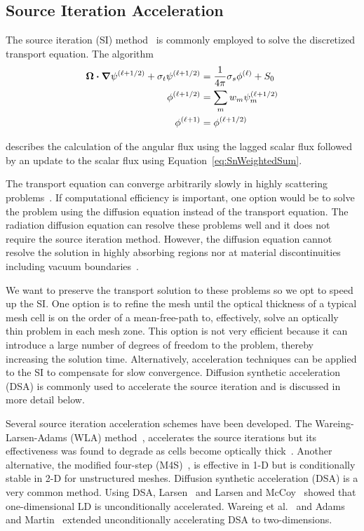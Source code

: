\documentclass{article}
\begin{document}
\subsection{Source Iteration Acceleration}
The source iteration (SI) method~\cite{Lewis_Comp_Methods_Neu_Trans} is commonly employed to solve the discretized transport equation. The algorithm
\begin{subequations}
\begin{flalign}
\bm{\Omega} \bm{\cdot} \bm{\nabla} \psi^{(\ell+1/2)} + \sigma_t \psi^{(\ell+1/2)} & = \frac{1}{4 \pi} \sigma_s \phi^{(\ell)} + S_0 \\
\phi^{(\ell+1/2)} & = \sum_m w_m \psi^{(\ell+1/2)}_m \\
\phi^{(\ell+1)} & = \phi^{(\ell+1/2)}
\end{flalign}
\label{eqs:SourceIteration}
\end{subequations}

\noindent describes the calculation of the angular flux using the lagged scalar flux followed by an update to the scalar flux using Equation~\ref{eq:SnWeightedSum}.

The transport equation can converge arbitrarily slowly in highly scattering problems~\cite{LarsenStableDSATheory}. If computational efficiency is important, one option would be to solve the problem using the diffusion equation instead of the transport equation. The radiation diffusion equation can resolve these problems well and it does not require the source iteration method. However, the diffusion equation cannot resolve the solution in highly absorbing regions nor at material discontinuities including vacuum boundaries~\cite{D&H}.

We want to preserve the transport solution to these problems so we opt to speed up the SI. One option is to refine the mesh until the optical thickness of a typical mesh cell is on the order of a mean-free-path to, effectively, solve an optically thin problem in each mesh zone. This option is not very efficient because it can introduce a large number of degrees of freedom to the problem, thereby increasing the solution time. Alternatively, acceleration techniques can be applied to the SI to compensate for slow convergence. Diffusion synthetic acceleration (DSA) is commonly used to accelerate the source iteration and is discussed in more detail below.

Several source iteration acceleration schemes have been developed. The Wareing-Larsen-Adams (WLA) method~\cite{WareingDSADFEM}, accelerates the source iterations but its effectiveness was found to degrade as cells become optically thick~\cite{WarsaFullyConsistentLDDSA}. Another alternative, the modified four-step (M4S)~\cite{AdamsFastIterativeMethods}, is effective in 1-D but is conditionally stable in 2-D for unstructured meshes. Diffusion synthetic acceleration (DSA) is a very common method. Using DSA, Larsen~\cite{LarsenStableDSATheory} and Larsen and McCoy~\cite{LarsenStableDSANumericalResults} showed that one-dimensional LD is unconditionally accelerated. Wareing et al.~\cite{WareingDSADFEM} and Adams and Martin~\cite{AdamsDSADFEM} extended unconditionally accelerating DSA to two-dimensions.
\end{document}
